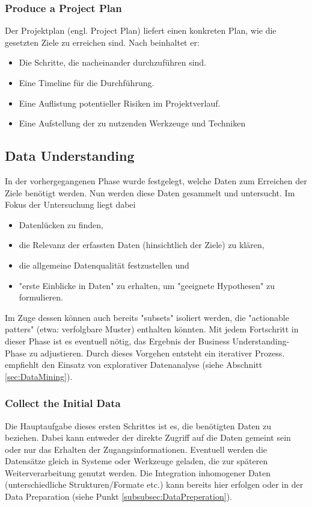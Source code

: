 \subsubsection{Produce a Project Plan}
Der Projektplan (engl. Project Plan) liefert einen konkreten Plan, wie die gesetzten Ziele zu erreichen sind. Nach \citep[S.~15]{shearer_crisp-dm_2000} beinhaltet er:
\begin{itemize}
\item Die Schritte, die nacheinander durchzuführen sind.
\item Eine Timeline für die Durchführung.
\item Eine Auflistung potentieller Risiken im Projektverlauf.
\item Eine Aufstellung der zu nutzenden Werkzeuge und Techniken \citep[S.~16]{chapman_crisp-dm_2000}
\end{itemize}


\subsection{Data Understanding}
In der vorhergegangenen Phase wurde festgelegt, welche Daten zum Erreichen der Ziele benötigt werden. Nun werden diese Daten gesammelt und untersucht. Im Fokus der Untersuchung liegt dabei\citep[S.~73]{swamynathan_mastering_2017}
\begin{itemize}
\item Datenlücken zu  finden,
\item die Relevanz der erfassten Daten (hinsichtlich der Ziele) zu klären,
\item die allgemeine Datenqualität festzustellen und
\item "erste Einblicke in Daten" zu erhalten, um "geeignete Hypothesen"\citep[S.~73; eigene Übersetzung]{swamynathan_mastering_2017} zu formulieren.
\end{itemize}
Im Zuge dessen können auch bereits "subsets" isoliert werden, die "actionable patters"\citep[Punkt 1.4.1.2.d]{larose_discovering_2014} (etwa: verfolgbare Muster) enthalten könnten. Mit jedem Fortschritt in dieser Phase ist es eventuell nötig, das Ergebnis der Business Understanding-Phase zu adjustieren. Durch dieses Vorgehen entsteht ein iterativer Prozess.\citep[S.~73]{swamynathan_mastering_2017} \citep[Punkt 1.4.1.2.b]{larose_discovering_2014} empfiehlt den Einsatz von explorativer Datenanalyse (siehe Abschnitt \ref{sec:DataMining}). 


\subsubsection{Collect the Initial Data}
Die Hauptaufgabe dieses ersten Schrittes ist es, die benötigten Daten zu beziehen. Dabei kann entweder der direkte Zugriff auf die Daten gemeint sein oder nur das Erhalten der Zugangsinformationen. Eventuell werden die Datensätze gleich in Systeme oder Werkzeuge geladen, die zur späteren Weiterverarbeitung genutzt werden. Die Integration inhomogener Daten (unterschiedliche Strukturen/Formate etc.) kann bereits hier erfolgen oder in der Data Preparation (siehe Punkt \ref{subsubsec:DataPreperation}). \citep[S.~18]{chapman_crisp-dm_2000}

